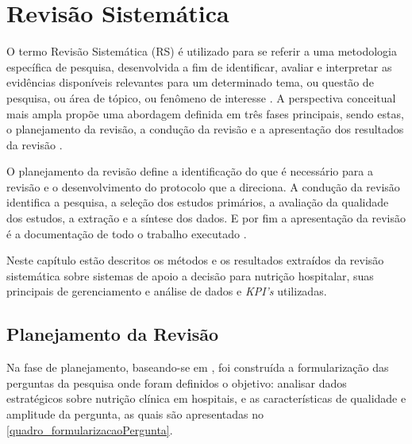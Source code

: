 \chapter{Revisão Sistemática}\label{cap_trabalho_academico}
O termo Revisão Sistemática (RS) é utilizado para se referir a uma metodologia específica de pesquisa, desenvolvida a fim de identificar, avaliar e interpretar as evidências disponíveis relevantes para um determinado tema, ou questão de pesquisa, ou área de tópico, ou fenômeno de interesse \cite{biolchini2005, kitchenham2004}. A perspectiva conceitual mais ampla propõe uma abordagem definida em três fases principais, sendo estas, o planejamento da revisão, a condução da revisão e a apresentação dos resultados da revisão \cite{biolchini2005}. 

O planejamento da revisão define a identificação do que é necessário para a revisão e o desenvolvimento do protocolo que a direciona. A condução da revisão identifica a pesquisa, a seleção dos estudos primários, a avaliação da qualidade dos estudos, a extração e a síntese dos dados. E por fim a apresentação da revisão é a documentação de todo o trabalho executado \cite{kitchenham2004}.

Neste capítulo estão descritos os métodos e os resultados extraídos da revisão sistemática sobre sistemas de apoio a decisão para nutrição hospitalar, suas principais de gerenciamento e análise de dados e \textit{KPI's} utilizadas.

\section{Planejamento da Revisão}

Na fase de planejamento, baseando-se em , foi construída a formularização das perguntas da pesquisa onde foram definidos o objetivo: analisar dados estratégicos sobre nutrição clínica em hospitais, e as características de qualidade e amplitude da pergunta, as quais são apresentadas no \autoref{quadro_formularizacaoPergunta}.
\newline
\newline
\newline

